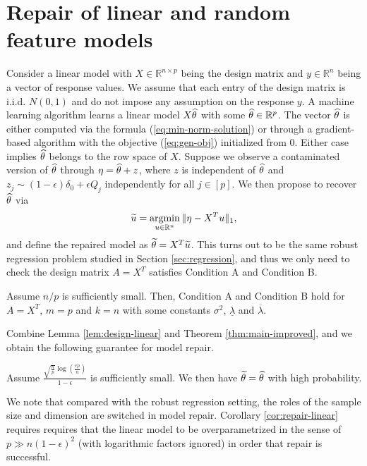 


\section{Repair of linear and random feature models}
\label{sec:linear}

Consider a linear model with $X\in\mathbb{R}^{n\times p}$ being the design matrix and $y\in\mathbb{R}^n$ being a vector of response values. We assume that each entry of the design matrix is i.i.d. $N(0,1)$ and do not impose any assumption on the response $y$. A machine learning algorithm learns a linear model $X\widehat{\theta}$ with some $\widehat{\theta}\in\mathbb{R}^{p}$. The vector $\widehat{\theta}$ is either computed via the formula (\ref{eq:min-norm-solution}) or through a gradient-based algorithm with the objective (\ref{eq:gen-obj}) initialized from $0$. Either case implies $\widehat{\theta}$ belongs to the row space of $X$. Suppose we observe a contaminated version of $\widehat{\theta}$ through $
\eta=\widehat{\theta}+z$, where $z$ is independent of $\widehat{\theta}$ and $z_j\sim (1-\epsilon)\delta_0+\epsilon Q_j$ independently for all $j\in[p]$. We then propose to recover $\widehat{\theta}$ via
$$\widetilde{u}=\mathop{\rm argmin}_{u\in\mathbb{R}^n}\|\eta-X^Tu\|_1,$$
and define the repaired model as $\widetilde{\theta}=X^T\widetilde{u}$. This turns out to be the same robust regression problem studied in Section \ref{sec:regression}, and thus we only need to check the design matrix $A=X^T$ satisfies Condition A and Condition B.
\begin{lemma}\label{lem:design-linear}
Assume $n/p$ is sufficiently small. Then, Condition A and Condition B hold for $A=X^T$, $m=p$ and $k=n$ with some constants $\sigma^2$, $\underline{\lambda}$ and $\overline{\lambda}$.
\end{lemma}
Combine Lemma \ref{lem:design-linear} and Theorem \ref{thm:main-improved}, and we obtain the following guarantee for model repair.
\begin{corollary}\label{cor:repair-linear}
Assume $\frac{\sqrt{\frac{n}{p}}\log\left(\frac{ep}{n}\right)}{1-\epsilon}$ is sufficiently small. We then have $\widetilde{\theta}=\widehat{\theta}$ with high probability.
\end{corollary}

We note that compared with the robust regression setting, the roles of the sample size and dimension are switched in model repair. Corollary \ref{cor:repair-linear} requires requires that the linear model to be overparametrized in the sense of $p\gg n(1-\epsilon)^2$ (with logarithmic factors ignored) in order that repair is successful. 

